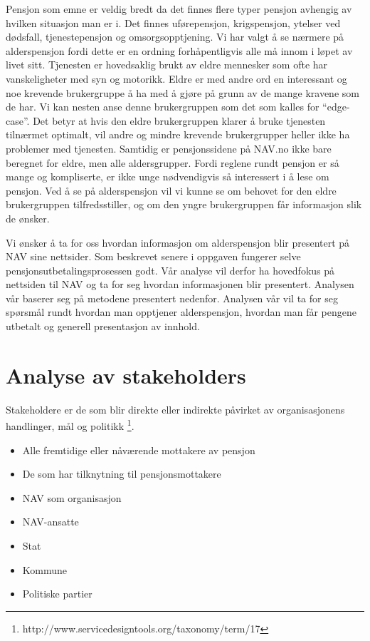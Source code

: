\documentclass[informationsecurity]{gucmasterproject}
\begin{document}
Pensjon som emne er veldig bredt da det finnes flere typer pensjon avhengig av hvilken situasjon man er i. Det finnes uførepensjon, krigspensjon, ytelser ved dødsfall, tjenestepensjon og omsorgsopptjening. Vi har valgt å se nærmere på alderspensjon fordi dette er en ordning forhåpentligvis alle må innom i løpet av livet sitt. Tjenesten er hovedsaklig brukt av eldre mennesker som ofte har vanskeligheter med syn og motorikk. Eldre er med andre ord en interessant og noe krevende brukergruppe å ha med å gjøre på grunn av de mange kravene som de har. Vi kan nesten anse denne brukergruppen som det som kalles for “edge-case”. Det betyr at hvis den eldre brukergruppen klarer å bruke tjenesten tilnærmet optimalt, vil andre og mindre krevende brukergrupper heller ikke ha problemer med tjenesten. Samtidig er pensjonssidene på NAV.no ikke bare beregnet for eldre, men alle aldersgrupper. Fordi reglene rundt pensjon er så mange og kompliserte, er ikke unge nødvendigvis så interessert i å lese om pensjon. Ved å se på alderspensjon vil vi kunne se om behovet for den eldre brukergruppen tilfredsstiller, og om den yngre brukergruppen får informasjon slik de ønsker.

Vi ønsker å ta for oss hvordan informasjon om alderspensjon blir presentert på NAV sine nettsider. Som beskrevet senere i oppgaven fungerer selve pensjonsutbetalingsprosessen godt. Vår analyse vil derfor ha hovedfokus på nettsiden til NAV og ta for seg hvordan informasjonen blir presentert. Analysen vår baserer seg på metodene presentert nedenfor. Analysen vår vil ta for seg spørsmål rundt hvordan man opptjener alderspensjon, hvordan man får pengene utbetalt og generell presentasjon av innhold.



\section{Analyse av stakeholders}
Stakeholdere er de som blir direkte eller indirekte påvirket av organisasjonens handlinger, mål og politikk \footnote{http://www.servicedesigntools.org/taxonomy/term/17}.
\begin{itemize}
\item Alle fremtidige eller nåværende mottakere av pensjon
\item De som har tilknytning til pensjonsmottakere
\item NAV som organisasjon
\item NAV-ansatte
\item Stat
\item Kommune
\item Politiske partier
\end{itemize}
\end{document}
